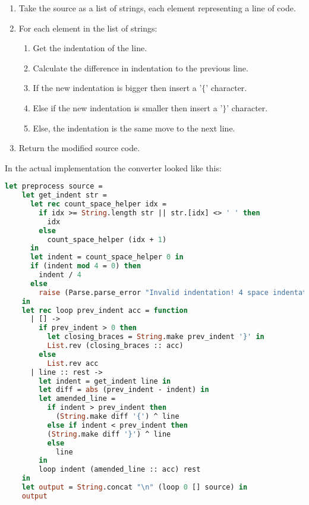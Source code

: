 \documentclass{l4proj}
\begin{document}
\begin{enumerate}
    \item Take the source as a list of strings, each element representing a line of code.
    \item For each element in the list of strings:
    \begin{enumerate}
        \item Get the indentation of the line.
        \item Calculate the difference in indentation to the previous line.
        \item If the new indentation is bigger then insert a '$\{$' character.
        \item Else if the new indentation is smaller then insert a '$\}$' character.
        \item Else, the indentation is the same move to the next line.
    \end{enumerate}
    \item Return the modified source code.
\end{enumerate}

In the actual implementation the converter looked like this:

\begin{lstlisting}[language=Caml, caption=The 'preprocess' function that handles all whitespace scoping in PyFunc.]
let preprocess source =
    let get_indent str = 
      let rec count_space_helper idx = 
        if idx >= String.length str || str.[idx] <> ' ' then
          idx
        else
          count_space_helper (idx + 1)
      in
      let indent = count_space_helper 0 in
      if (indent mod 4 = 0) then
        indent / 4
      else
        raise (Parse.parse_error "Invalid indentation! 4 space indentation required.")
    in
    let rec loop prev_indent acc = function
      | [] -> 
        if prev_indent > 0 then
          let closing_braces = String.make prev_indent '}' in
          List.rev (closing_braces :: acc)
        else 
          List.rev acc
      | line :: rest ->
        let indent = get_indent line in
        let diff = abs (prev_indent - indent) in
        let amended_line =
          if indent > prev_indent then
            (String.make diff '{') ^ line
          else if indent < prev_indent then
          (String.make diff '}') ^ line
          else
            line
        in
        loop indent (amended_line :: acc) rest
    in
    let output = String.concat "\n" (loop 0 [] source) in
    output
\end{lstlisting}
\end{document}
